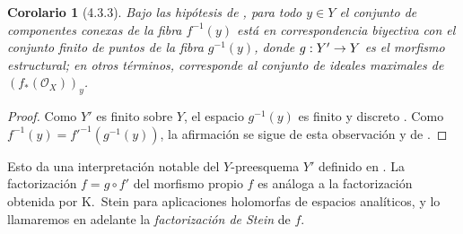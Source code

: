 \documentclass[10pt,oneside,openany]{book}
\theoremstyle{egaenv}\newtheorem*{env}{---}
\theoremstyle{egastatement}
\newtheorem*{corollary}{Corolario}
\theoremstyle{egadescription}
\renewcommand{\to}{\mathchoice{\longrightarrow}{\rightarrow}{\rightarrow}{\rightarrow}}
\begin{document}
\begin{corollary}[4.3.3]
\label{III.4.3.3}
\label{III.4.3.3-fr}
Bajo las hipótesis de \textup{}, para todo $y\in Y$ el conjunto
de componentes conexas de la fibra $f^{-1}(y)$ está en correspondencia
biyectiva con el conjunto finito de puntos de la fibra
$g^{-1}(y)$, donde $g:Y'\to Y$ es el morfismo estructural; en otros
términos, corresponde al conjunto de \emph{ideales maximales} de
$(f_*(\mathcal O_X))_y$.
\end{corollary}

\begin{proof}
Como $Y'$ es finito sobre $Y$, el espacio $g^{-1}(y)$ es finito y
discreto . Como
$f^{-1}(y)=f'^{-1}(g^{-1}(y))$,
la afirmación se sigue de esta observación y de
.
\end{proof}

Esto da una interpretación notable del $Y$-preesquema $Y'$ definido en
. La factorización
$f=g\circ f'$ del morfismo propio $f$ es análoga a la factorización
obtenida por K.~Stein para aplicaciones holomorfas de espacios
analíticos, y lo llamaremos en adelante la \emph{factorización de Stein}
de $f$.
\end{document}

